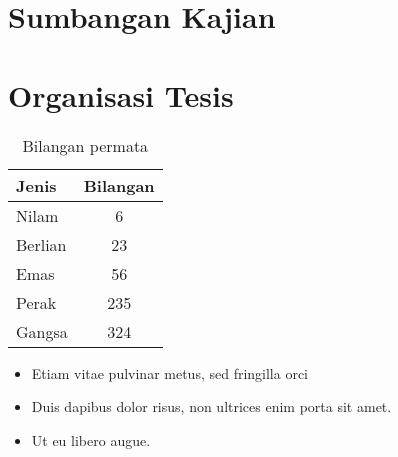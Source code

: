 \section{Sumbangan Kajian}

\section{Organisasi Tesis}

\begin{table}[hbt!]\centering
\caption{Bilangan permata}
\begin{tabular}{l c}
\hline
Jenis & Bilangan \\\hline
Nilam & 6\\
Berlian & 23\\
Emas & 56\\
Perak & 235\\
Gangsa & 324\\\hline
\end{tabular}
\end{table}

\begin{itemize}
  \item Etiam vitae pulvinar metus, sed fringilla orci
  \item Duis dapibus dolor risus, non ultrices enim porta sit amet.
  \item Ut eu libero augue.
\end{itemize}